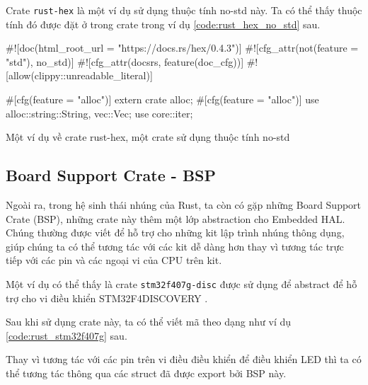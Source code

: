 Crate \texttt{rust-hex} \cite{hex_no_std} là một ví dụ sử dụng thuộc tính no-std này.
Ta có thể thấy thuộc tính đó được đặt ở trong crate trong ví dụ \ref{code:rust_hex_no_std} sau.

\begin{listing}[ht]
\begin{rustcode}
#![doc(html_root_url = "https://docs.rs/hex/0.4.3")]
#![cfg_attr(not(feature = "std"), no_std)]
#![cfg_attr(docsrs, feature(doc_cfg))]
#![allow(clippy::unreadable_literal)]

#[cfg(feature = "alloc")]
extern crate alloc;
#[cfg(feature = "alloc")]
use alloc::{string::String, vec::Vec};
use core::iter;
\end{rustcode}
\caption{Một ví dụ về crate rust-hex, một crate sử dụng thuộc tính no-std}
\label{code:rust_hex_no_std}
\end{listing}

\subsection{Board Support Crate - BSP}
Ngoài ra, trong hệ sinh thái nhúng của Rust, ta còn có gặp những Board Support Crate (BSP), những crate này thêm một lớp abstraction cho Embedded HAL.
Chúng thường được viết để hỗ trợ cho những kit lập trình nhúng thông dụng, giúp chúng ta có thể tương tác với các kit dễ dàng hơn thay vì tương tác trực tiếp với các pin và các ngoại vi của CPU trên kit.

Một ví dụ có thể thấy là crate \texttt{stm32f407g-disc} \cite{stm32f407g_disc} được sử dụng để abstract để hỗ trợ cho vi điều khiển STM32F4DISCOVERY \cite{discovery_datasheet}.

Sau khi sử dụng crate này, ta có thể viết mã theo dạng như ví dụ \ref{code:rust_stm32f407g} sau.

Thay vì tương tác với các pin trên vi điều điều khiển để điều khiển LED thì ta có thể tương tác thông qua các struct đã được export bởi BSP này.

